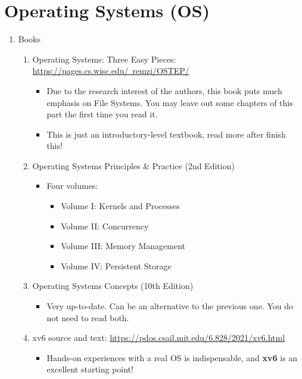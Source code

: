 \documentclass{article}
\begin{document}
\section{Operating Systems (OS)}
\begin{enumerate}
    \item Books
        \begin{enumerate}
        \item Operating Systems: Three Easy Pieces:
        \href{https://pages.cs.wisc.edu/~remzi/OSTEP/}{https://pages.cs.wisc.edu/~remzi/OSTEP/}
        \begin{itemize}
            \item Due to the research interest of the authors, this book puts much emphasis on File Systems.
            You may leave out some chapters of this part the first time you read it.
            \item This is just an introductory-level textbook, read more after finish this!
        \end{itemize}
        \item Operating Systems Principles \& Practice (2nd Edition)
        \begin{itemize}
            \item Four volumes:
            \begin{itemize}
                \item Volume I: Kernels and Processes \cite{anderson2014operating1}
                \item Volume II: Concurrency \cite{andersonoperating2}
                \item Volume III: Memory Management \cite{andersonoperating3}
                \item Volume IV: Persistent Storage \cite{andersonoperating4}
            \end{itemize}
        \end{itemize}
        \item Operating Systems Concepts (10th Edition) \cite{peterson1985operating}
        \begin{itemize}
            \item Very up-to-date.
            Can be an alternative to the previous one.
            You do not need to read both.
        \end{itemize}
        \item xv6 source and text:
        \href{https://pdos.csail.mit.edu/6.828/2021/xv6.html}{https://pdos.csail.mit.edu/6.828/2021/xv6.html}
        \begin{itemize}
            \item Hands-on experiences with a real OS is indispensable, and \textbf{xv6} is an excellent starting point!
        \end{itemize}    


\end{enumerate}
\end{enumerate}
\end{document}
